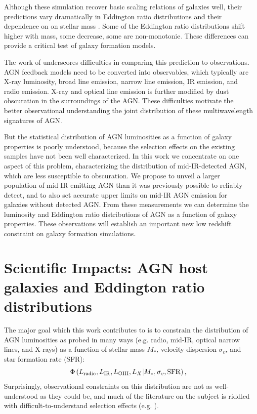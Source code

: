 \documentclass[12pt, preprint]{hacked-aastex}
\begin{document}
Although these simulation recover basic scaling relations of galaxies
well, their predictions vary dramatically in Eddington ratio
distributions and their dependence on on stellar mass
\cite{habouzit22a}. Some of the Eddington ratio distributions shift
higher with mass, some decrease, some are non-monotonic.  These
differences can provide a critical test of galaxy formation models.

The work of \cite{habouzit22a} underscores difficulties in comparing
this prediction to observations. AGN feedback models need to be
converted into observables, which typically are X-ray luminosity,
broad line emission, narrow line emission, IR emission, and radio
emission. X-ray and optical line emission is further modified by dust
obscuration in the surroundings of the AGN. These difficulties
motivate the better observational understanding the joint distribution
of these multiwavelength signatures of AGN.

But the statistical distribution of AGN luminosities as a function of
galaxy properties is poorly understood, because the selection effects
on the existing samples have not been well characterized. In this work
we concentrate on one aspect of this problem, characterizing the
distribution of mid-IR-detected AGN, which are less susceptible to
obscuration.  We propose to unveil a larger population of mid-IR
emitting AGN than it was previously possible to reliably detect, and
to also set accurate upper limits on mid-IR AGN emission for galaxies
without detected AGN. From these measurements we can determine the
luminosity and Eddington ratio distributions of AGN as a function of
galaxy properties.  These observations will establish an important new
low redshift constraint on galaxy formation simulations.

\section{Scientific Impacts: AGN host galaxies and Eddington ratio distributions}\label{sec:intro}


The major goal which this work contributes to is to constrain the
distribution of AGN luminosities as probed in many ways (e.g. radio,
mid-IR, optical narrow lines, and X-rays) as a function of stellar
mass $M_\ast$, velocity dispersion $\sigma_v$, and star formation rate
(SFR):
\begin{equation}
\label{eq:model}
\Phi\left(L_{\rm radio}, L_{\rm IR}, L_{\rm OIII}, L_X | M_\ast, \sigma_v, {\rm SFR}\right),
\end{equation}
Surprisingly, observational constraints on this distribution are not
as well-understood as they could be, and much of the literature on the
subject is riddled with difficult-to-understand selection effects
(e.g. \cite{trump15a, jones17a, hviding22a}).
\end{document}
